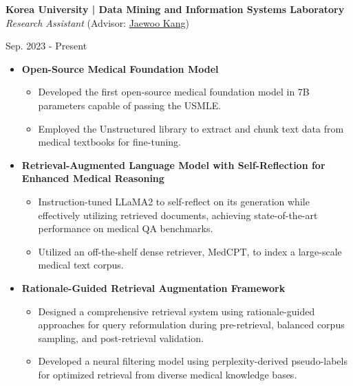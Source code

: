 \documentclass[10pt, letterpaper]{article}
\newenvironment{highlights}{
    \begin{itemize}[
        topsep=0.10 cm,
        parsep=0.10 cm,
        partopsep=0pt,
        itemsep=0pt,
        leftmargin=0 cm + 10pt
    ]
}{
    \end{itemize}
} %
\newenvironment{twocolentry}[2][]{
    \onecolentry
    \def\secondColumn{#2}
    \setcolumnwidth{\fill, 3.5 cm}
    \begin{paracol}{2}
}{
    \switchcolumn \raggedleft \secondColumn
    \end{paracol}
    \endonecolentry
} %
\begin{document}
\vspace{0.3 cm}      
\begin{twocolentry}{
            Sep. 2023 - Present\\ 
}
\textbf{Korea University | Data Mining and Information Systems Laboratory} \href{https://dmis.korea.ac.kr/home}{\faExternalLink*}\\
\textit{Research Assistant} (Advisor: \href{https://scholar.google.co.kr/citations?user=RaBZafQAAAAJ&hl=ko}{Jaewoo Kang})
        \end{twocolentry}
\vspace{0.2 cm}
\begin{highlights}
    \item \textbf{Open-Source Medical Foundation Model}
    \vspace{-0.1 cm}
    \begin{highlights}
        \item Developed the first open-source medical foundation model in 7B parameters capable of passing the USMLE.
    \item Employed the Unstructured library to extract and chunk text data from medical textbooks for fine-tuning.
\end{highlights}
    \item \textbf{Retrieval-Augmented Language Model with Self-Reflection for Enhanced Medical Reasoning}
\vspace{-0.1 cm}
    \begin{highlights}
\item Instruction-tuned LLaMA2 to self-reflect on its generation while effectively utilizing retrieved documents, achieving state-of-the-art performance on medical QA benchmarks.
\item Utilized an off-the-shelf dense retriever, MedCPT, to index a large-scale medical text corpus.
    \end{highlights}

    \item \textbf{Rationale-Guided Retrieval Augmentation Framework}
    \vspace{-0.1 cm}
\begin{highlights}
    \item Designed a comprehensive retrieval system using rationale-guided approaches for query reformulation during pre-retrieval, balanced corpus sampling, and post-retrieval validation.
    \item Developed a neural filtering model using perplexity-derived pseudo-labels for optimized retrieval from diverse medical knowledge bases.
\end{highlights}
\end{highlights}
\end{document}
